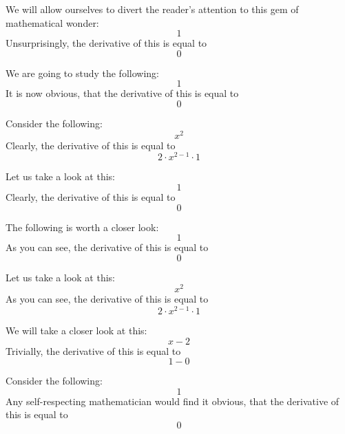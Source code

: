 \documentclass{article}
\begin{document}
We will allow ourselves to divert the reader's attention to this gem of mathematical wonder:
\begin{equation}
1 
\end{equation}
Unsurprisingly, the derivative of this is equal to
\begin{equation}
0 
\end{equation}

We are going to study the following:
\begin{equation}
1 
\end{equation}
It is now obvious, that the derivative of this is equal to
\begin{equation}
0 
\end{equation}

Consider the following:
\begin{equation}
x ^{2 } 
\end{equation}
Clearly, the derivative of this is equal to
\begin{equation}
2 \cdot x ^{2 - 1 } \cdot 1 
\end{equation}

Let us take a look at this:
\begin{equation}
1 
\end{equation}
Clearly, the derivative of this is equal to
\begin{equation}
0 
\end{equation}

The following is worth a closer look:
\begin{equation}
1 
\end{equation}
As you can see, the derivative of this is equal to
\begin{equation}
0 
\end{equation}

Let us take a look at this:
\begin{equation}
x ^{2 } 
\end{equation}
As you can see, the derivative of this is equal to
\begin{equation}
2 \cdot x ^{2 - 1 } \cdot 1 
\end{equation}

We will take a closer look at this:
\begin{equation}
x - 2 
\end{equation}
Trivially, the derivative of this is equal to
\begin{equation}
1 - 0 
\end{equation}

Consider the following:
\begin{equation}
1 
\end{equation}
Any self-respecting mathematician would find it obvious, that the derivative of this is equal to
\begin{equation}
0 
\end{equation}
\end{document}
